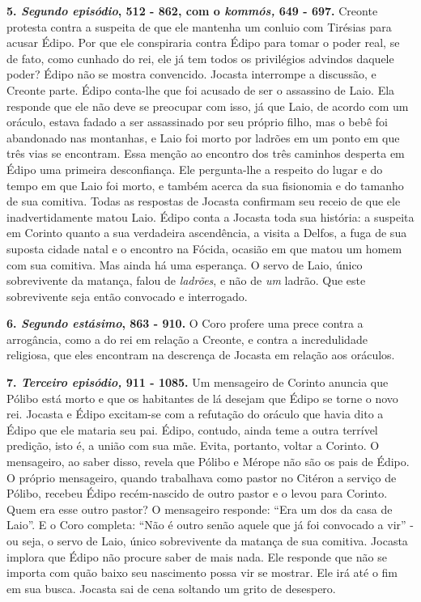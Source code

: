\textbf{5. \emph{Segundo episódio}, 512 - 862, com o \emph{kommós,} 649
- 697.} Creonte protesta contra a suspeita de que ele mantenha um
conluio com Tirésias para acusar Édipo. Por que ele conspiraria contra
Édipo para tomar o poder real, se de fato, como cunhado do rei, ele já
tem todos os privilégios advindos daquele poder? Édipo não se mostra
convencido. Jocasta interrompe a discussão, e Creonte parte. Édipo
conta-lhe que foi acusado de ser o assassino de Laio. Ela responde que
ele não deve se preocupar com isso, já que Laio, de acordo com um
oráculo, estava fadado a ser assassinado por seu próprio filho, mas o
bebê foi abandonado nas montanhas, e Laio foi morto por ladrões em um
ponto em que três vias se encontram. Essa menção ao encontro dos três
caminhos desperta em Édipo uma primeira desconfiança. Ele pergunta-lhe a
respeito do lugar e do tempo em que Laio foi morto, e também acerca da
sua fisionomia e do tamanho de sua comitiva. Todas as respostas de
Jocasta confirmam seu receio de que ele inadvertidamente matou Laio.
Édipo conta a Jocasta toda sua história: a suspeita em Corinto quanto a
sua verdadeira ascendência, a visita a Delfos, a fuga de sua suposta
cidade natal e o encontro na Fócida, ocasião em que matou um homem com
sua comitiva. Mas ainda há uma esperança. O servo de Laio, único
sobrevivente da matança, falou de \emph{ladrões}, e não de \emph{um}
ladrão. Que este sobrevivente seja então convocado e interrogado.

\textbf{6. \emph{Segundo estásimo}, 863 - 910.} O Coro profere uma prece
contra a arrogância, como a do rei em relação a Creonte, e contra a
incredulidade religiosa, que eles encontram na descrença de Jocasta em
relação aos oráculos.

\textbf{7. \emph{Terceiro episódio,} 911 - 1085.} Um mensageiro de
Corinto anuncia que Pólibo está morto e que os habitantes de lá desejam
que Édipo se torne o novo rei. Jocasta e Édipo excitam-se com a
refutação do oráculo que havia dito a Édipo que ele mataria seu pai.
Édipo, contudo, ainda teme a outra terrível predição, isto é, a união
com sua mãe. Evita, portanto, voltar a Corinto. O mensageiro, ao saber
disso, revela que Pólibo e Mérope não são os pais de Édipo. O próprio
mensageiro, quando trabalhava como pastor no Citéron a serviço de
Pólibo, recebeu Édipo recém-nascido de outro pastor e o levou para
Corinto. Quem era esse outro pastor? O mensageiro responde: ``Era um dos
da casa de Laio''. E o Coro completa: ``Não é outro senão aquele que já
foi convocado a vir'' - ou seja, o servo de Laio, único sobrevivente da
matança de sua comitiva. Jocasta implora que Édipo não procure saber de
mais nada. Ele responde que não se importa com quão baixo seu nascimento
possa vir se mostrar. Ele irá até o fim em sua busca. Jocasta sai de
cena soltando um grito de desespero.

